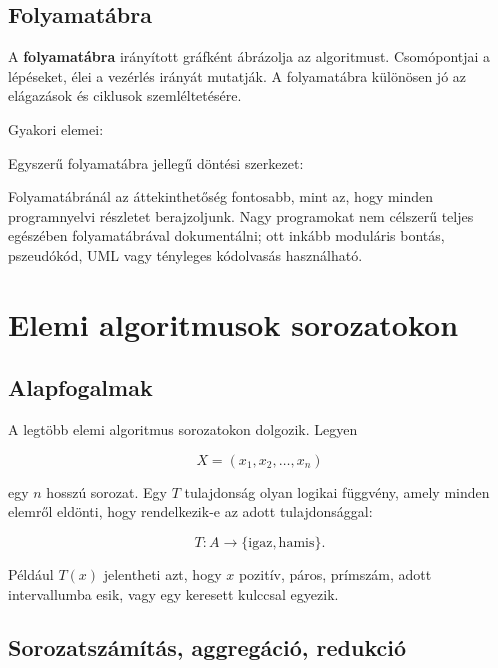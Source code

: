 \subsection{Folyamatábra}

A \textbf{folyamatábra} irányított gráfként ábrázolja az algoritmust. Csomópontjai a lépéseket, élei a vezérlés irányát mutatják. A folyamatábra különösen jó az elágazások és ciklusok szemléltetésére.

Gyakori elemei:

\begin{center}

\end{center}

Egyszerű folyamatábra jellegű döntési szerkezet:



\begin{warningbox}
Folyamatábránál az áttekinthetőség fontosabb, mint az, hogy minden programnyelvi részletet berajzoljunk. Nagy programokat nem célszerű teljes egészében folyamatábrával dokumentálni; ott inkább moduláris bontás, pszeudókód, UML vagy tényleges kódolvasás használható.
\end{warningbox}

\section{Elemi algoritmusok sorozatokon}

\subsection{Alapfogalmak}

A legtöbb elemi algoritmus sorozatokon dolgozik. Legyen

\[
X=(x_1,x_2,\ldots,x_n)
\]

egy $n$ hosszú sorozat. Egy $T$ tulajdonság olyan logikai függvény, amely minden elemről eldönti, hogy rendelkezik-e az adott tulajdonsággal:

\[
T:A\to\{\text{igaz},\text{hamis}\}.
\]

Például $T(x)$ jelentheti azt, hogy $x$ pozitív, páros, prímszám, adott intervallumba esik, vagy egy keresett kulccsal egyezik.

\subsection{Sorozatszámítás, aggregáció, redukció}

